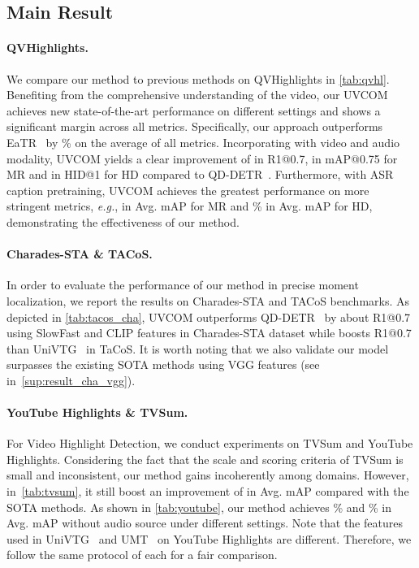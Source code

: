 \documentclass[10pt,twocolumn,letterpaper]{article}
\begin{document}
\subsection{Main Result}
\paragraph{QVHighlights.} We compare our method to previous methods on QVHighlights in \cref{tab:qvhl}.
Benefiting from the comprehensive understanding of the video, our UVCOM achieves new state-of-the-art performance on different settings and shows a significant margin across all metrics.
Specifically, our approach outperforms EaTR~\cite{eatr} by \% on the average of all metrics.
Incorporating with video and audio modality, UVCOM yields a clear improvement of  in R1@0.7,  in mAP@0.75 for MR and  in HID@1 for HD compared to QD-DETR~\cite{qddetr}.
Furthermore, with ASR caption pretraining, UVCOM achieves the greatest performance on more stringent metrics, \textit{e.g.},  in Avg. mAP for MR and \% in Avg. mAP for HD, demonstrating the effectiveness of our method. 

\vspace{-10pt}
\paragraph{Charades-STA \& TACoS.}
In order to evaluate the performance of our method in precise moment localization, we report the results on Charades-STA and TACoS benchmarks.
As depicted in \cref{tab:tacos_cha}, UVCOM outperforms QD-DETR~\cite{qddetr} by about  R1@0.7 using SlowFast and CLIP features in Charades-STA dataset while boosts  R1@0.7 than UniVTG~\cite{univtg} in TaCoS. It is worth noting that we also validate our model surpasses the existing SOTA methods using VGG features (see in~\cref{sup:result_cha_vgg}).

\vspace{-10pt}
\paragraph{YouTube Highlights \& TVSum.}
For Video Highlight Detection, we conduct experiments on TVSum and YouTube Highlights. Considering the fact that the scale and scoring criteria of TVSum is small and inconsistent, our method gains incoherently among domains.
However, in~\cref{tab:tvsum}, it still boost an improvement of  in Avg. mAP compared with the SOTA methods. As shown in \cref{tab:youtube}, our method achieves \% and \% in Avg. mAP without audio source under different settings. 
Note that the features used in UniVTG~\cite{univtg} and UMT~\cite{umt} on YouTube Highlights are different. Therefore, we follow the same protocol of each for a fair comparison.
\end{document}
